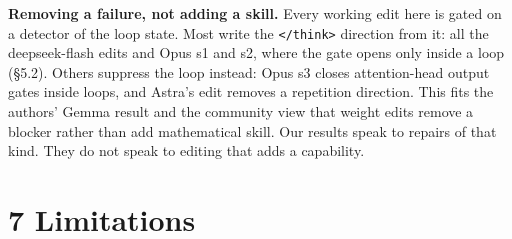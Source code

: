 \documentclass[
  10pt,
]{article}
\newcommand{\passthrough}[1]{#1}
\begin{document}
\textbf{Removing a failure, not adding a skill.} Every working edit here
is gated on a detector of the loop state. Most write the
\passthrough{\lstinline!</think>!} direction from it: all the
deepseek-flash edits and Opus s1 and s2, where the gate opens only
inside a loop (\S{}5.2). Others suppress the loop instead: Opus s3 closes
attention-head output gates inside loops, and Astra's edit removes a
repetition direction. This fits the authors' Gemma result and the
community view that weight edits remove a blocker rather than add
mathematical skill. Our results speak to repairs of that kind. They do
not speak to editing that adds a capability.

\section{7 Limitations}\label{limitations}
\end{document}
